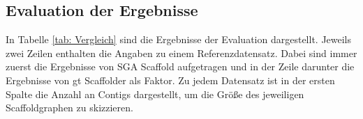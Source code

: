 \documentclass[a4paper,10pt,parskip]{scrartcl}
\begin{document}
\subsection{Evaluation der Ergebnisse}

In Tabelle \ref{tab: Vergleich} sind die Ergebnisse der Evaluation
dargestellt. Jeweils zwei Zeilen enthalten die Angaben zu einem
Referenzdatensatz. Dabei sind immer zuerst die Ergebnisse von SGA
Scaffold aufgetragen und in der Zeile darunter die Ergebnisse von gt
Scaffolder als Faktor. Zu jedem Datensatz ist in der ersten Spalte die
Anzahl an Contigs dargestellt, um die Größe des jeweiligen
Scaffoldgraphen zu skizzieren.

\begin{table}
  \caption{\label{tab: Vergleich}Vergleich der Ergebnisse, der
    Laufzeit und des Speicherplatzbedarfs von gt Scaffolder und
    SGA-Scaffold.}
\end{table}
\end{document}
